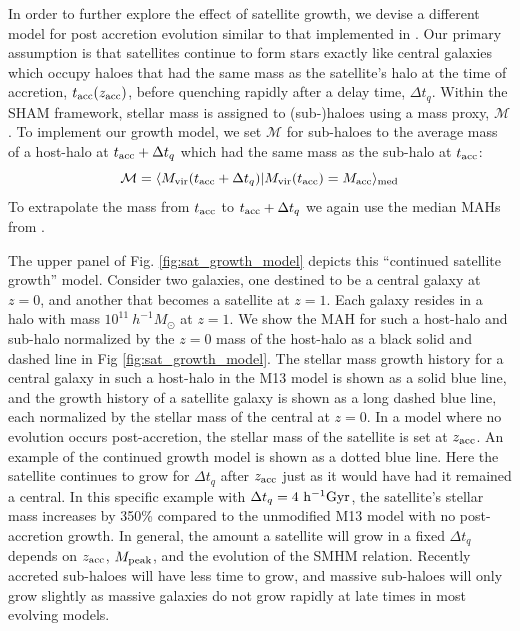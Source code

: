 \documentclass[useAMS,fleqn,usenatbib]{mnras}
\begin{document}
In order to further explore the effect of satellite growth, we devise a different model for post accretion evolution similar to that implemented in \cite{Behroozi:2015wx}.  Our primary assumption is that satellites continue to form stars exactly like central galaxies which occupy haloes that had the same mass as the satellite's halo at the time of accretion, $t_{\rm acc}(z_{\rm acc})$, before quenching rapidly after a delay time, $\Delta t_{q}$.  Within the SHAM framework, stellar mass is assigned to (sub-)haloes using a mass proxy, $\mathcal{M}$.  To implement our growth model, we set $\mathcal{M}$ for sub-haloes to the average mass of a host-halo at $t_{\rm acc} + \Delta t_{q}$ which had the same mass as the sub-halo at $t_{\rm acc}$:
%
\begin{equation}
\mathcal{M} = \langle M_{\rm vir}( t_{\rm acc}+\Delta t_{q}) | M_{\rm vir}( t_{\rm acc}) = M_{\rm acc}\rangle_{\rm med}
\end{equation}
%
To extrapolate the mass from $t_{\rm acc}$ to $t_{\rm acc}+\Delta t_{q}$ we again use the median MAHs from \citet{Bosch:2014cu}.

The upper panel of Fig. \ref{fig:sat_growth_model} depicts this ``continued satellite growth'' model.  Consider two galaxies, one destined to be a central galaxy at $z=0$, and another that becomes a satellite at $z=1$.  Each galaxy resides in a halo with mass $10^{11}~h^{-1}M_{\odot}$ at $z=1$.  We show the MAH for such a host-halo and sub-halo normalized by the $z=0$ mass of the host-halo as a black solid and dashed line in Fig \ref{fig:sat_growth_model}.  The stellar mass growth history for a central galaxy in such a host-halo in the M13 model is shown as a solid blue line, and the growth history of a satellite galaxy is shown as a long dashed blue line, each  normalized by the stellar mass of the central at $z=0$.  In a model where no evolution occurs post-accretion, the stellar mass of the satellite is set at $z_{\rm acc}$.  An example of the continued growth model is shown as a dotted blue line. Here the satellite continues to grow for $\Delta t_q$ after $z_{\rm acc}$ just as it would have had it remained a central.  In this specific example with $\Delta t_q= 4~{\rm h^{-1}Gyr}$, the satellite's stellar mass increases by 350\% compared to the unmodified M13 model with no post-accretion growth.  In general, the amount a satellite will grow in a fixed $\Delta t_q$ depends on $z_{\rm acc}$, $M_{\rm peak}$, and the evolution of the SMHM relation.  Recently accreted sub-haloes will have less time to grow, and massive sub-haloes will only grow slightly as massive galaxies do not grow rapidly at late times in most evolving models.  
\end{document}
